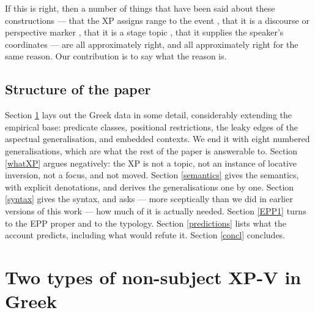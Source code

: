 \documentclass[11pt]{article}
\begin{document}
\medskip
If this is right, then a number of things that have been said about these constructions --- that the XP assigns range to the event \citep{Borer:05a}, that it is a discourse or perspective marker \citep{alexiadou:11b}, that it is a stage topic \citep{Erteschik-Shir:97, cohen-erteschik-shir:02}, that it supplies the speaker's coordinates \citep{giorgi:10} --- are all approximately right, and all approximately right for the same reason.  Our contribution is to say what the reason is.

\subsection{Structure of the paper}

Section \ref{Greeksection} lays out the Greek data in some detail, considerably extending the empirical base: predicate classes, positional restrictions, the leaky edges of the aspectual generalisation, and embedded contexts.  We end it with eight numbered generalisations, which are what the rest of the paper is answerable to.  Section \ref{whatXP} argues negatively: the XP is not a topic, not an instance of locative inversion, not a focus, and not moved.  Section \ref{semantics} gives the semantics, with explicit denotations, and derives the generalisations one by one.  Section \ref{syntax} gives the syntax, and asks --- more sceptically than we did in earlier versions of this work --- how much of it is actually needed.  Section \ref{EPP1} turns to the EPP proper and to the typology.  Section \ref{predictions} lists what the account predicts, including what would refute it.  Section \ref{concl} concludes.

\section{Two types of non-subject XP-V in Greek}\label{Greeksection}
\end{document}
